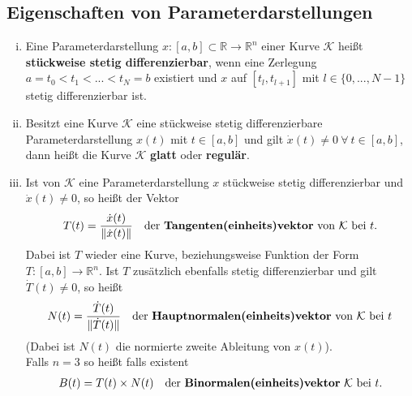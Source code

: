 \documentclass[11pt,a4paper]{book}
\newcommand {\R}	{\mathbb{R}}
\newcommand {\Rn}	{\mathbb{R}^n}
\newcommand{\1}    	{\mathbbm{1}}
\newcommand{\Kurve}	{{\mathcal{K}}}
\begin{document}
\subsection{Eigenschaften von Parameterdarstellungen}
\begin{enumerate}[(i)]
	\item Eine Parameterdarstellung \(x: [a,b] \subset \R \rightarrow \Rn\) einer Kurve \(\Kurve\) heißt \textbf{stückweise stetig differenzierbar}, wenn eine Zerlegung \(a = t_0 < t_1 < ... < t_N = b\) existiert und \(x\) auf \([t_l, t_{l+1}]\) mit \(l \in \{ 0, ..., N-1 \}\) stetig differenzierbar ist.
	\item Besitzt eine Kurve \(\Kurve\) eine stückweise stetig differenzierbare Parameterdarstellung \(x(t)\) mit \(t \in [a,b]\) und gilt \(\dot{x}(t) \neq 0 ~\forall~ t \in [a,b]\), dann heißt die Kurve \(\Kurve\) \textbf{glatt} oder \textbf{regulär}.
	\item Ist von \(\Kurve\) eine Parameterdarstellung \(x\) stückweise stetig differenzierbar und \(\dot{x}(t) \neq 0\), so heißt der Vektor
	\begin{align*}
		T(t) = \frac{\dot{x}(t)}{\Vert \dot{x}(t) \Vert} \quad
		\textrm{der \textbf{Tangenten(einheits)vektor} von \(\Kurve\) bei \(t\).}
	\end{align*}
	Dabei ist \(T\) wieder eine Kurve, beziehungsweise Funktion der Form \(T:[a,b] \rightarrow \Rn\). Ist \(T\) zusätzlich ebenfalls stetig differenzierbar und gilt \(\dot{T}(t) \neq 0\), so heißt
	\begin{align*}
		N(t) = \frac{\dot{T}(t)}{\Vert \dot{T}(t) \Vert} \quad
		\textrm{der \textbf{Hauptnormalen(einheits)vektor} von \(\Kurve\) bei }t
	\end{align*}
	(Dabei ist \(N(t)\) die normierte zweite Ableitung von \(x(t)\)).\\
	Falls \(n=3\) so heißt falls existent
	\begin{align*}
		B(t) = T(t) \times N(t) \quad
		\textrm{der \textbf{Binormalen(einheits)vektor} \(\Kurve\) bei \(t\).}
	\end{align*}
\end{enumerate}
\end{document}
